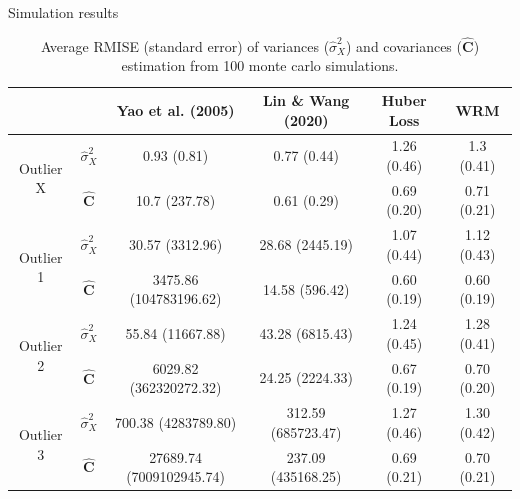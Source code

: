 \documentclass[9pt]{beamer}
\begin{document}
\begin{frame}[allowframebreaks]{Simulation results}
 	\begin{table}[ht]
 		\footnotesize
 		\centering
 		\tabcolsep=4.5pt
 		\begin{tabular}{cccccc}
 			\hline\hline
 			& & Yao et al. (2005) & Lin \& Wang (2020) & Huber Loss & WRM \\ 
 			\hline
 			\multirow{2}{*}{Outlier X} & $\hat{\sigma}_X^2$ & 0.93 (0.81) & 0.77 (0.44) & 1.26 (0.46) & 1.3 (0.41) \\ 
 									   & $\hat{\mathbf{C}}$ & 10.7 (237.78) & 0.61 (0.29) & 0.69 (0.20) & 0.71 (0.21) \\ 
 			\hline
 			\multirow{2}{*}{Outlier 1} & $\hat{\sigma}_X^2$ & 30.57 (3312.96) & 28.68 (2445.19) & 1.07 (0.44) & 1.12 (0.43) \\ 
 									   & $\hat{\mathbf{C}}$ & 3475.86 (104783196.62) & 14.58 (596.42) & 0.60 (0.19) & 0.60 (0.19) \\ 
 			\hline
 			\multirow{2}{*}{Outlier 2} & $\hat{\sigma}_X^2$ & 55.84 (11667.88) & 43.28 (6815.43) & 1.24 (0.45) & 1.28 (0.41) \\ 
	 		 						   & $\hat{\mathbf{C}}$ & 6029.82 (362320272.32) & 24.25 (2224.33) & 0.67 (0.19) & 0.70 (0.20) \\ 
	 		\hline
 			\multirow{2}{*}{Outlier 3} & $\hat{\sigma}_X^2$ & 700.38 (4283789.80) & 312.59 (685723.47) & 1.27 (0.46) & 1.30 (0.42) \\ 
 									   & $\hat{\mathbf{C}}$ & 27689.74 (7009102945.74) & 237.09 (435168.25) & 0.69 (0.21) & 0.70 (0.21) \\ 
 			\hline\hline
 		\end{tabular}
 		\caption{Average RMISE (standard error) of variances ($\hat\sigma^2_X$) and covariances ($\hat{\mathbf{C}}$) estimation from 100 monte carlo simulations.}\label{t1}
 	\end{table}



\end{frame}
\end{document}
